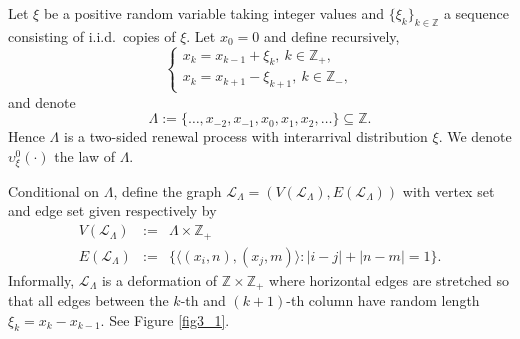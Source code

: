 \documentclass[a4paper,oneside,12pt]{amsart}
\theoremstyle{plain}
\theoremstyle{definition}
\theoremstyle{remark}
\begin{document}
Let $\xi$ be a positive random variable taking integer values and $\{\xi_k\}_{k\in\mathbb{Z}}$ a sequence consisting of i.i.d.\ copies of $\xi$.
Let $x_0 =0$ and define recursively, 
\begin{equation}
\label{e:def_renewal}
\begin{cases}
x_{k} = x_{k-1}+\xi_{k}, ~ k \in \mathbb{Z}_{+},\\
x_{k} = x_{k+1}-\xi_{k+1}, ~ k \in \mathbb{Z}_{-},
\end{cases}
\end{equation}
and denote
\begin{equation}
\label{e:def_lambda}
\Lambda:= \{\ldots, x_{-2}, x_{-1}, x_0, x_1, x_2,\ldots\} \subseteq \mathbb{Z}.
\end{equation}
Hence $\Lambda$ is a two-sided renewal process with  interarrival distribution $\xi$.
We denote $\upsilon^{0}_\xi(\cdot)$ the law of $\Lambda$.

Conditional on \(\Lambda\), define the graph \(\mathcal{L}_\Lambda = (V(\mathcal{L}_\Lambda), E(\mathcal{L}_\Lambda))\) with vertex set and edge set given respectively by  
\begin{eqnarray}
V(\mathcal{L}_\Lambda) &:=& \Lambda \times \mathbb{Z}_+  \nonumber\\
E(\mathcal{L}_\Lambda) &:=& \big\{\langle(x_i, n), (x_j, m)\rangle \colon |i - j| + |n - m| = 1 \big\}.\nonumber
\end{eqnarray}  
Informally, \(\mathcal{L}_\Lambda\) is a deformation of \(\mathbb{Z} \times \mathbb{Z}_+\) where horizontal edges are stretched so that all edges between the \(k\)-th and \((k+1)\)-th column have random length \(\xi_k=x_{k} - x_{k-1}\).  
See Figure \ref{fig3_1}.
\end{document}
